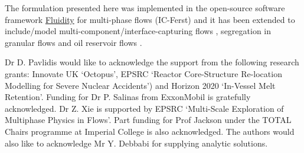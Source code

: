 \documentclass[times]{fldauth}
\begin{document}
The formulation presented here was implemented in the open-source
software framework
\href{http://www3.imperial.ac.uk/earthscienceandengineering/research/amcg/fluidity}{Fluidity}
for multi-phase flows (IC-Ferst) and it has been extended to
include/model multi-component/interface-capturing flows
\cite{pavlidis_2013b,pavlidis_2014,xie_2014}, segregation in granular
flows \cite{percival_2014} and oil reservoir flows
\cite{jackson_2015,mostaghimi_2015, Salinas}.



\ack Dr D. Pavlidis would like to acknowledge the support from the
following research grants: Innovate UK `Octopus', EPSRC `Reactor
Core-Structure Re-location Modelling for Severe Nuclear Accidents')
and Horizon 2020 `In-Vessel Melt Retention'. Funding for Dr P. Salinas
from ExxonMobil is gratefully acknowledged. Dr Z. Xie is supported by
EPSRC `Multi-Scale Exploration of Multiphase Physics in Flows'. Part
funding for Prof Jackson under the TOTAL Chairs programme at Imperial
College is also acknowledged. The authors would also like to acknowledge
Mr Y. Debbabi for supplying analytic solutions.





\end{document}
